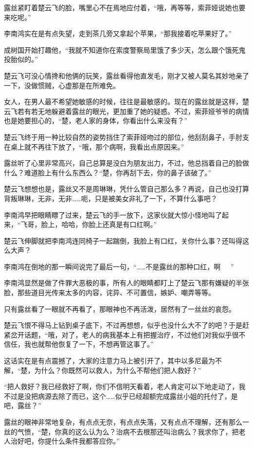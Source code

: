 露丝紧盯着楚云飞的脸，嘴里心不在焉地应付着，“哦，再等等，索菲娅说她也要来吃呢。”

李南鸿实在是有点失望，走到茶几旁又拿起个苹果，“那我接着吃苹果好了。”

成树国开始打趣他，“我就不知道你在索度警察局里饿了多少天，怎么跟个饿死鬼投胎似的。”

楚云飞可没心情搀和他俩的玩笑，露丝看得他直发毛，刚才又被人莫名其妙地亲了一下，没做惯贼，心虚那是在所难免。

女人，在男人最不希望她敏感的时候，往往是最敏感的。现在的露丝就是这样，楚云飞若有若无地躲避着露丝的眼光，更加重了她的疑惑。不过，索菲娅爷爷的病情也是她要担心的，“楚，老人家的身体，你看出什么来没有？”

楚云飞终于用一种比较自然的姿势挡住了索菲娅吻过的部位，他刮刮鼻子，手肘支在桌上就不再往下放了，“哦，那个病啊，我看出点原因来。”

露丝听了心里非常高兴，自己总算是没白为朋友出力，不过，他总挡着自己的脸做什么？难道脸上有什么东西么？“楚，你再刮下去，你的鼻子该破了。”

楚云飞想想也是，露丝又不是周琳琳，凭什么管自己那么多？再说，自己也没打算背叛琳琳，无非，无非……呃，只是被美女非礼了一下，不算什么事吧？

李南鸿早把眼睛瞟了过来，楚云飞的手一放下，这家伙就大惊小怪地叫了起来，“飞哥，脸上，哈哈，你脸上还真是有口红啊。”

楚云飞伸脚就把李南鸿连同椅子一起踹倒，我脸上有口红，关你什么事？还叫得这么大声？

李南鸿在倒地的那一瞬间说完了最后一句，“……不是露丝的那种口红，啊~~~”

李南鸿显然是做了件罪大恶极的事，所有人的眼睛都盯上了楚云飞那有嫌疑的半张脸，那些道目光传来太多的内容，诧异、不可置信，嫉妒、嘲弄等等。

只有露丝看了一眼就不再看了，那眼神也不再活泼，居然有了一丝丝的哀怨。

楚云飞恨不得马上钻到桌子底下，不过再想想，似乎也没什么大不了的吧？于是赶紧岔开话题，“哦，对了，老人的病我基本上有把握治疗，不过他们对我似乎很不信任，我也就帮他恢复了一下，不想再管这事了。”

这话实在是有点震撼了，大家的注意力马上被引开了，其中以多尼最为不解，“楚，为什么？你既然可以救人，为什么不帮他们把人救好？”

“把人救好？我已经救好了啊，你们不信明天看着，老人肯定可以下地走动了，我不过是没把病源去除了而已，这个……似乎已经超额完成露丝小姐的托付了，是吧，露丝？”

露丝的眼神非常地复杂，有点点无奈，有点点失落，又有点点不理解，还有那么一丝的气愤，“楚，你真的这么认为么？治病不去根那还叫治病么？我求你了，把老人治好吧，你提什么条件我都答应你。”

